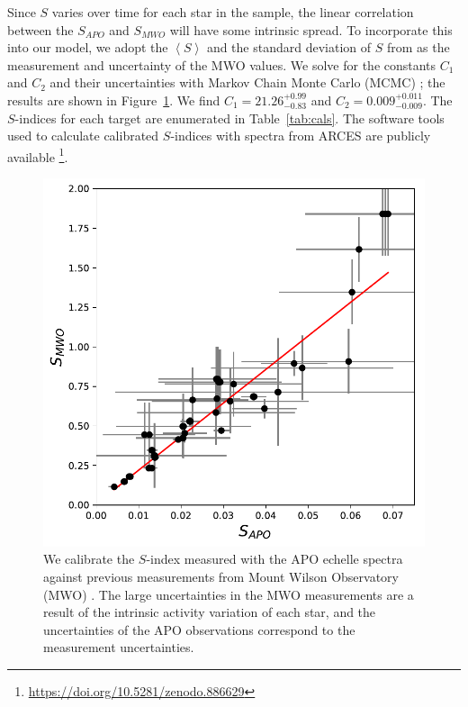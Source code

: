 Since $S$ varies over time for each star in the sample, the linear correlation between the $S_{APO}$ and $S_{MWO}$ will have some intrinsic spread. To incorporate this into our model, we adopt the $\left< S \right>$ and the standard deviation of $S$ from \citet{Duncan1991} as the measurement and uncertainty of the MWO values. We solve for the constants $C_1$ and $C_2$ and their uncertainties with Markov Chain Monte Carlo (MCMC) \citep{Goodman2010, Foreman-Mackey2013}; the results are shown in Figure~\ref{fig:calib}. We find $C_1 = 21.26_{-0.83}^{+0.99}$ and $C_2 = 0.009_{-0.009}^{+0.011}$. The $S$-indices for each target are enumerated in Table~\ref{tab:cals}. The software tools used to calculate calibrated $S$-indices with spectra from ARCES are publicly available \footnote{\url{https://doi.org/10.5281/zenodo.886629}}.

\begin{figure}
\begin{center}
\includegraphics[scale=0.6]{sindex/s-index_calibration.pdf}
\caption{We calibrate the $S$-index measured with the APO echelle spectra against previous measurements from Mount Wilson Observatory (MWO) \citep{Duncan1991}. The large uncertainties in the MWO measurements are a result of the intrinsic activity variation of each star, and the uncertainties of the APO observations correspond to the measurement uncertainties.}
\end{center}
\label{fig:calib}
\end{figure}

